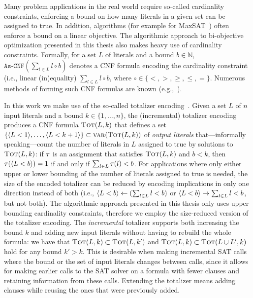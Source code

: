Many problem applications in the real world require so-called cardinality constraints, enforcing a bound on how many literals in a given set can be assigned to true.
In addition, algorithms (for example for MaxSAT~\autocite{handbook2-maxsat}) often enforce a bound on a linear objective.
The algorithmic approach to bi-objective optimization presented in this thesis also makes heavy use of cardinality constraints.
Formally, for a set $L$ of literals and a bound $b \in \mathbb{N}$, $\texttt{As-CNF}\left(\sum_{l \in L} l \circ b\right)$ denotes a CNF formula encoding the cardinality constraint (i.e., linear (in)equality) $\sum_{l \in L} l \circ b$, where $\circ \in \{< ,> ,\geq, \leq, =\}$.
Numerous methods of forming such CNF formulas are known (e.g.,~\autocites{DBLP:conf/cp/BailleuxB03,DBLP:conf/cp/Sinz05,DBLP:journals/jsat/EenS06}).

In this work we make use of the so-called totalizer encoding~\autocites{DBLP:conf/cp/BailleuxB03,DBLP:conf/cp/MartinsJML14}.
Given a set $L$ of $n$ input literals and a bound $k\in\{1,\dots,n\}$, the (incremental) totalizer encoding produces a CNF formula $\textsc{Tot}(L, k)$ that defines a set $\{\langle L < 1 \rangle, \ldots, \langle L < k+1 \rangle\} \subset \textsc{var}(\textsc{Tot}(L,k))$ of \emph{output literals} that---informally speaking---count the number of literals in $L$ assigned to true by solutions to $\textsc{Tot}(L,k)$:
if $\tau$ is an assignment that satisfies $\textsc{Tot}(L,k)$ and $b < k$, then $\tau(\langle L < b \rangle) = 1$ if and only if $\sum_{l \in L} \tau(l) < b$.
For applications where only either upper or lower bounding of the number of literals assigned to true is needed, the size of the encoded totalizer can be reduced by encoding implications in only one direction instead of both (i.e., $\langle L < b \rangle \leftarrow (\sum_{l \in L} l < b)$ or $\langle L < b \rangle \rightarrow \sum_{l \in L} l < b$, but not both).
The algorithmic approach presented in this thesis only uses upper bounding cardinality constraints, therefore we employ the size-reduced version of the totalizer encoding.
The \emph{incremental} totalizer supports both increasing the bound $k$ and adding new input literals without having to rebuild the whole formula:
we have that $\textsc{Tot}(L, k) \subset \textsc{Tot}(L, k')$ and $\textsc{Tot}(L, k) \subset  \textsc{Tot}(L \cup L', k)$ hold for any bound $k' > k$. 
This is desirable when making incremental SAT calls where the bound or the set of input literals changes between calls, since it allows for making earlier calls to the SAT solver on a formula with fewer clauses and retaining information from these calls.
Extending the totalizer means adding clauses while reusing the ones that were previously added.

